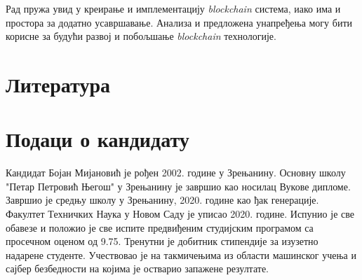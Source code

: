 \documentclass[12pt, a4paper]{article}
\begin{document}
Рад пружа увид у креирање и имплементацију \textit{blockchain} система, иако има и простора за додатно усавршавање. Анализа и предложена унапређења могу бити корисне за будући развој и побољшање \textit{blockchain} технологије.


\pagebreak
\section{Литература}
\renewcommand{\refname}{}
\vspace{-\parskip} %
\vspace{-\parskip} %
\vspace{-\parskip} %
\vspace{-\parskip} %
\setlength{\bibsep}{8pt}



\pagebreak
\section{Подаци о кандидату}
Кандидат Бојан Мијановић је рођен 2002. године у Зрењанину. Основну школу "Петар Петровић Његош" у Зрењанину је завршио као носилац Вукове дипломе. Завршио је средњу школу у Зрењанину, 2020. године као ђак генерације. Факултет Техничких Наука у Новом Саду је уписао 2020. године. Испунио је све обавезе и положио је све испите предвиђеним студијским програмом са просечном оценом од 9.75. Тренутни је добитник стипендије за изузетно надарене студенте. Учествовао је на такмичењима из области машинског учења и сајбер безбедности на којима је остварио запажене резултате.


\end{document}

